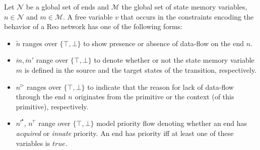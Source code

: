 Let $\mathcal{N}$ be a global set of ends and $\mathcal{M}$ the global set of state memory variables, $n \in \mathcal{N}$ and $m \in \mathcal{M}$. A free variable $v$ that occurs in the constraints encoding the behavior of a Reo network has one of the following forms:
%

\begin{itemize}
 \item $\tilde{n}$ ranges over $\{ \top, \bot \}$ to show presence or absence of data-flow on the end $n$.
 \item $\mathring{m}, \mathring{m}'$ range over $\{ \top, \bot \}$ to denote whether or not the state memory variable $m$ is defined in the source and the target states of the transition, respectively.
 \item $n^\triangleright$ ranges over $\{ \top, \bot \}$ to indicate that the reason for lack of data-flow through the end $n$ originates from the primitive or the context (of this primitive), respectively.
 \item $n^{!^\bullet}$, $n^{!^\circ}$ range over $\{ \top, \bot \}$ model priority flow denoting whether an end has \emph{acquired} or \emph{innate} priority. An end has priority iff at least one of these variables is $true$.

\end{itemize}

